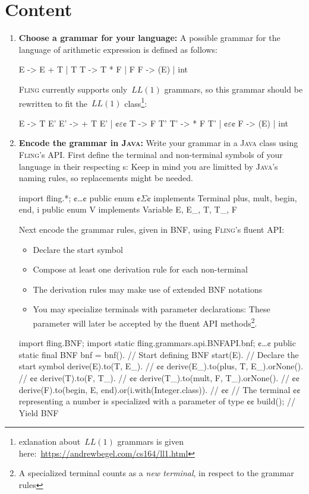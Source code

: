 \documentclass[a4paper,UKenglish,cleveref, autoref]{darts-v2019}
\newcommand{\Fling}{F\textsc{ling}\xspace}
\newcommand{\Java}{\textsc{Java}\xspace}
\providecommand\cc[1]{\textcolor{Sepia}{\text{\textup{\textbf{\texttt{#1}}}}}}
\newenvironment{content}{\section{Content}}{}
\begin{document}
\begin{content}
\begin{enumerate}
	\item \textbf{Choose a grammar for your language:} A possible grammar for the language
	of arithmetic expression is defined as follows:
	\begin{excerpt*}
E -> E + T | T
T -> T * F | F
F -> (E) | int
	\end{excerpt*}
	\Fling currently supports only~$LL(1)$ grammars, so this grammar should be
	rewritten to fit the~$LL(1)$ class\footnote{exlanation about~$LL(1)$ grammars is given here:~\href{https://andrewbegel.com/cs164/ll1.html}{https://andrewbegel.com/cs164/ll1.html}}:
	\begin{excerpt*}
E  -> T E'
E' -> + T E' | ¢$\varepsilon$¢
T  -> F T'
T' -> * F T' | ¢$\varepsilon$¢
F  -> (E) | int
	\end{excerpt*}
	
	\item \textbf{Encode the grammar in \Java:} Write your grammar in a \Java class
	using \Fling's API.
	First define the terminal and non-terminal symbols of your language in their respecting
	\cc{enum}s: Keep in mind you are limitted by \Java's naming rules, so replacements
	might be needed.
	\begin{excerpt*}[language=java]
import fling.*;
¢\ldots¢
public enum ¢$\Sigma$¢ implements Terminal {
  plus, mult, begin, end, i
}
public enum V implements Variable {
  E, E_, T, T_, F
}
	\end{excerpt*}
	
	Next encode the grammar rules, given in BNF, using \Fling's fluent API:
	\begin{itemize}
		\item Declare the start symbol
		\item Compose at least one derivation rule for each non-terminal
		\item The derivation rules may make use of extended BNF notations
		\item You may specialize terminals with parameter declarations: These
			parameter will later be accepted by the fluent API methods\footnote{
			A specialized terminal counts as a \textit{new terminal}, in respect to the grammar rules}.
	\end{itemize}
	\begin{excerpt*}[language=java]
import fling.BNF;
import static fling.grammars.api.BNFAPI.bnf;
¢\ldots¢
public static final BNF bnf = bnf(). // Start defining BNF
  start(E). // Declare the start symbol
  derive(E).to(T, E_). // ¢\cc{E ::= T E'}¢
  derive(E_).to(plus, T, E_).orNone(). // ¢\cc{E' ::= + T E' | $\varepsilon$}¢
  derive(T).to(F, T_). // ¢\cc{T ::= F T'}¢
  derive(T_).to(mult, F, T_).orNone(). // ¢\cc{T' ::= * F T' | $\varepsilon$}¢
  derive(F).to(begin, E, end).or(i.with(Integer.class)). // ¢\cc{F ::= (E) | int}¢
  // The terminal ¢\cc{i}¢ representing a number is specialized with a parameter of type ¢\cc{Integer}¢
  build(); // Yield BNF
	\end{excerpt*}


\end{enumerate}
\end{content}
\end{document}
